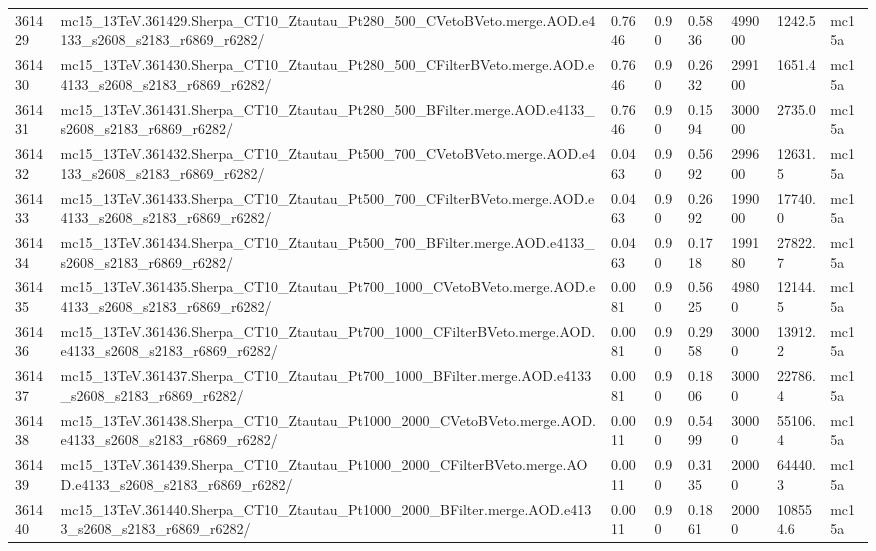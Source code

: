 \begin{sidewaystable}[!htp]
\begin{center}
{\begin{tabular}{llllllll}
361429  &  mc15\_13TeV.361429.Sherpa\_CT10\_Ztautau\_Pt280\_500\_CVetoBVeto.merge.AOD.e4133\_s2608\_s2183\_r6869\_r6282/  &  0.7646  &  0.90  &  0.5836  &  499000  &  1242.5  &  mc15a \\
361430  &  mc15\_13TeV.361430.Sherpa\_CT10\_Ztautau\_Pt280\_500\_CFilterBVeto.merge.AOD.e4133\_s2608\_s2183\_r6869\_r6282/  &  0.7646  &  0.90  &  0.2632  &  299100  &  1651.4  &  mc15a \\
361431  &  mc15\_13TeV.361431.Sherpa\_CT10\_Ztautau\_Pt280\_500\_BFilter.merge.AOD.e4133\_s2608\_s2183\_r6869\_r6282/  &  0.7646  &  0.90  &  0.1594  &  300000  &  2735.0  &  mc15a \\
361432  &  mc15\_13TeV.361432.Sherpa\_CT10\_Ztautau\_Pt500\_700\_CVetoBVeto.merge.AOD.e4133\_s2608\_s2183\_r6869\_r6282/  &  0.0463  &  0.90  &  0.5692  &  299600  &  12631.5  &  mc15a \\
361433  &  mc15\_13TeV.361433.Sherpa\_CT10\_Ztautau\_Pt500\_700\_CFilterBVeto.merge.AOD.e4133\_s2608\_s2183\_r6869\_r6282/  &  0.0463  &  0.90  &  0.2692  &  199000  &  17740.0  &  mc15a \\
361434  &  mc15\_13TeV.361434.Sherpa\_CT10\_Ztautau\_Pt500\_700\_BFilter.merge.AOD.e4133\_s2608\_s2183\_r6869\_r6282/  &  0.0463  &  0.90  &  0.1718  &  199180  &  27822.7  &  mc15a \\
361435  &  mc15\_13TeV.361435.Sherpa\_CT10\_Ztautau\_Pt700\_1000\_CVetoBVeto.merge.AOD.e4133\_s2608\_s2183\_r6869\_r6282/  &  0.0081  &  0.90  &  0.5625  &  49800  &  12144.5  &  mc15a \\
361436  &  mc15\_13TeV.361436.Sherpa\_CT10\_Ztautau\_Pt700\_1000\_CFilterBVeto.merge.AOD.e4133\_s2608\_s2183\_r6869\_r6282/  &  0.0081  &  0.90  &  0.2958  &  30000  &  13912.2  &  mc15a \\
361437  &  mc15\_13TeV.361437.Sherpa\_CT10\_Ztautau\_Pt700\_1000\_BFilter.merge.AOD.e4133\_s2608\_s2183\_r6869\_r6282/  &  0.0081  &  0.90  &  0.1806  &  30000  &  22786.4  &  mc15a \\
361438  &  mc15\_13TeV.361438.Sherpa\_CT10\_Ztautau\_Pt1000\_2000\_CVetoBVeto.merge.AOD.e4133\_s2608\_s2183\_r6869\_r6282/  &  0.0011  &  0.90  &  0.5499  &  30000  &  55106.4  &  mc15a \\
361439  &  mc15\_13TeV.361439.Sherpa\_CT10\_Ztautau\_Pt1000\_2000\_CFilterBVeto.merge.AOD.e4133\_s2608\_s2183\_r6869\_r6282/  &  0.0011  &  0.90  &  0.3135  &  20000  &  64440.3  &  mc15a \\
361440  &  mc15\_13TeV.361440.Sherpa\_CT10\_Ztautau\_Pt1000\_2000\_BFilter.merge.AOD.e4133\_s2608\_s2183\_r6869\_r6282/  &  0.0011  &  0.90  &  0.1861  &  20000  &  108554.6  &  mc15a \\

\end{tabular}}
\end{center}
\end{sidewaystable}
